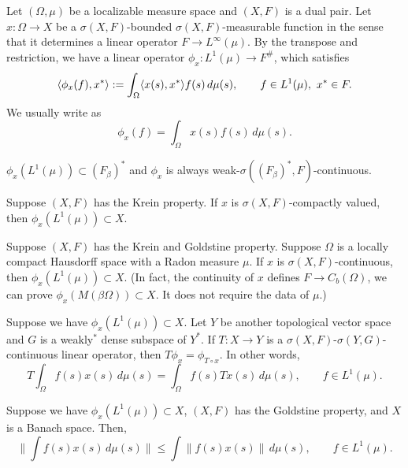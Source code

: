 \documentclass{../../large}
\begin{document}
\begin{prb}
Let $(\Omega,\mu)$ be a localizable measure space and $(X,F)$ is a dual pair.
Let $x:\Omega\to X$ be a $\sigma(X,F)$-bounded $\sigma(X,F)$-measurable function in the sense that it determines a linear operator $F\to L^\infty(\mu)$.
By the transpose and restriction, we have a linear operator $\phi_x:L^1(\mu)\to F^\#$, which satisfies
\[\langle\phi_x(f),x^*\rangle:=\int_\Omega \langle x(s),x^*\rangle f(s)\,d\mu(s),\qquad f\in L^1(\mu),\ x^*\in F.\]
We usually write as
\[\phi_x(f)=\int_\Omega x(s)f(s)\,d\mu(s).\]
\begin{parts}
\item $\phi_x(L^1(\mu))\subset(F_\beta)^*$ and $\phi_x$ is always weak-$\sigma((F_\beta)^*,F)$-continuous.
\item Suppose $(X,F)$ has the Krein property.
If $x$ is $\sigma(X,F)$-compactly valued, then $\phi_x(L^1(\mu))\subset X$.
\item Suppose $(X,F)$ has the Krein and Goldstine property.
Suppose $\Omega$ is a locally compact Hausdorff space with a Radon measure $\mu$.
If $x$ is $\sigma(X,F)$-continuous, then $\phi_x(L^1(\mu))\subset X$.
(In fact, the continuity of $x$ defines $F\to C_b(\Omega)$, we can prove $\phi_x(M(\beta\Omega))\subset X$. It does not require the data of $\mu$.)
\item Suppose we have $\phi_x(L^1(\mu))\subset X$. Let $Y$ be another topological vector space and $G$ is a weakly$^*$ dense subspace of $Y^*$. If $T:X\to Y$ is a $\sigma(X,F)$-$\sigma(Y,G)$-continuous linear operator, then $T\phi_x=\phi_{T\circ x}$. In other words,
\[T\int_\Omega f(s)x(s)\,d\mu(s)=\int_\Omega f(s)Tx(s)\,d\mu(s),\qquad f\in L^1(\mu).\]
\item Suppose we have $\phi_x(L^1(\mu))\subset X$, $(X,F)$ has the Goldstine property, and $X$ is a Banach space. Then,
\[\|\int f(s)x(s)\,d\mu(s)\|\le\int\|f(s)x(s)\|\,d\mu(s),\qquad f\in L^1(\mu).\]
\end{parts}
\end{prb}
\end{document}
